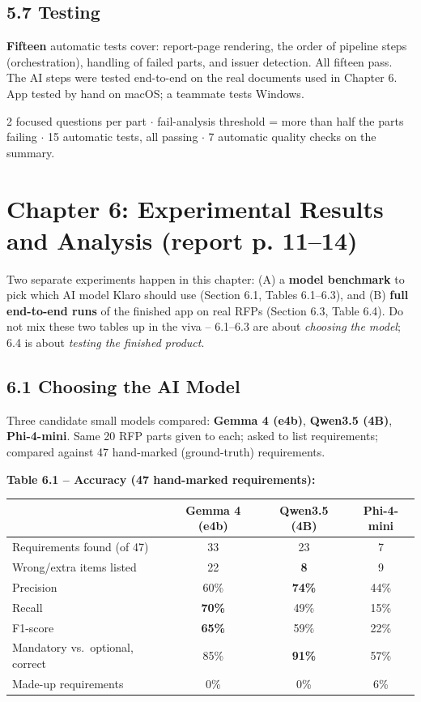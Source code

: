 \documentclass[11pt,a4paper]{article}
\begin{document}
\subsection*{5.7 Testing}
\textbf{Fifteen} automatic tests cover: report-page rendering, the order of pipeline steps
(orchestration), handling of failed parts, and issuer detection. All fifteen pass. The AI steps were
tested end-to-end on the real documents used in Chapter 6. App tested by hand on macOS; a teammate
tests Windows.

\begin{keynums}
2 focused questions per part $\cdot$ fail-analysis threshold = more than half the parts failing
$\cdot$ 15 automatic tests, all passing $\cdot$ 7 automatic quality checks on the summary.
\end{keynums}

\newpage
\section{Chapter 6: Experimental Results and Analysis (report p. 11--14)}

\begin{bigpicture}
Two separate experiments happen in this chapter: (A) a \textbf{model benchmark} to pick which AI
model Klaro should use (Section 6.1, Tables 6.1--6.3), and (B) \textbf{full end-to-end runs} of the
finished app on real RFPs (Section 6.3, Table 6.4). Do not mix these two tables up in the viva --
6.1--6.3 are about \emph{choosing the model}; 6.4 is about \emph{testing the finished product}.
\end{bigpicture}

\subsection*{6.1 Choosing the AI Model}
Three candidate small models compared: \textbf{Gemma 4 (e4b)}, \textbf{Qwen3.5 (4B)},
\textbf{Phi-4-mini}. Same 20 RFP parts given to each; asked to list requirements; compared against 47
hand-marked (ground-truth) requirements.

\textbf{Table 6.1 -- Accuracy (47 hand-marked requirements):}
\begin{center}
\small
\begin{tabular}{@{}lccc@{}}
\toprule
 & \textbf{Gemma 4 (e4b)} & \textbf{Qwen3.5 (4B)} & \textbf{Phi-4-mini}\\
\midrule
Requirements found (of 47) & 33 & 23 & 7\\
Wrong/extra items listed & 22 & \textbf{8} & 9\\
Precision & 60\% & \textbf{74\%} & 44\%\\
Recall & \textbf{70\%} & 49\% & 15\%\\
F1-score & \textbf{65\%} & 59\% & 22\%\\
Mandatory vs.\ optional, correct & 85\% & \textbf{91\%} & 57\%\\
Made-up requirements & 0\% & 0\% & 6\%\\
\bottomrule
\end{tabular}
\end{center}
\end{document}

